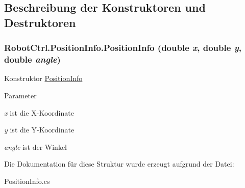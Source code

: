 \subsection{Beschreibung der Konstruktoren und Destruktoren}
\hypertarget{struct_robot_ctrl_1_1_position_info_a437f826ea5eb342dc35bdf9100c38b69}{
\subsubsection[{PositionInfo}]{\setlength{\rightskip}{0pt plus 5cm}RobotCtrl.PositionInfo.PositionInfo (double {\em x}, \/  double {\em y}, \/  double {\em angle})}}
\label{struct_robot_ctrl_1_1_position_info_a437f826ea5eb342dc35bdf9100c38b69}
Konstruktor \hyperlink{struct_robot_ctrl_1_1_position_info}{PositionInfo}


\begin{DoxyParams}{Parameter}
\item[{\em x}]ist die X-\/Koordinate \item[{\em y}]ist die Y-\/Koordinate \item[{\em angle}]ist der Winkel \end{DoxyParams}


Die Dokumentation für diese Struktur wurde erzeugt aufgrund der Datei:\begin{DoxyCompactItemize}
\item 
PositionInfo.cs\end{DoxyCompactItemize}
